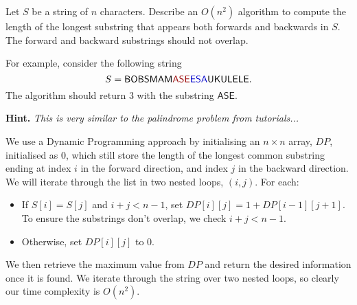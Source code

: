 \documentclass{article}
\begin{document}
\begin{question}
Let $S$ be a string of $n$ characters. Describe an $O(n^2)$ algorithm to compute the length of the longest substring that appears both forwards and backwards in $S$. The forward and backward substrings should not overlap.

For example, consider the following string \[S = \mathsf{BOBSMAM\textcolor{red!60!black}{ASE}\textcolor{blue!80!black}{ESA}UKULELE}.\] The algorithm should return 3 with the substring $\mathsf{ASE}$.

{\bfseries Hint.} {\em This is very similar to the palindrome problem from tutorials...}
\end{question}

\begin{solution}
We use a Dynamic Programming approach by initialising an $n \times n$ array, $DP$, initialised as $0$, which still store the length of the longest common substring ending at index $i$ in the forward direction, and index $j$ in the backward direction. We will iterate through the list in two nested loops, $(i,j)$. For each:
\begin{itemize}
\item If $S[i] = S[j]$ and $i + j < n-1$, set $DP[i][j] = 1 + DP[i-1][j+1]$. To ensure the substrings don't overlap, we check $i + j < n - 1$.
\item Otherwise, set $DP[i][j]$ to $0$.
\end{itemize}

We then retrieve the maximum value from $DP$ and return the desired information once it is found. We iterate through the string over two nested loops, so clearly our time complexity is $O(n^2)$.
\end{solution}
\end{document}
